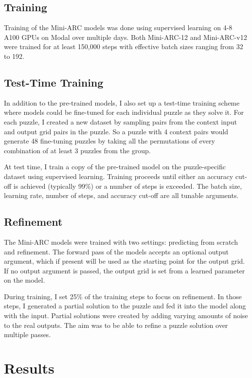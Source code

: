 \documentclass[10pt,twocolumn]{article}
\begin{document}
\subsection{Training}

Training of the Mini-ARC models was done using supervised learning on
4-8 A100 GPUs on Modal\cite{modal}
over multiple days. Both Mini-ARC-12 and Mini-ARC-v12 were trained
for at least 150,000 steps with effective batch sizes ranging from 32 to 192.

\subsection{Test-Time Training}

In addition to the pre-trained models, I also set up a test-time
training scheme where models could be fine-tuned for each individual
puzzle as they solve it. For each puzzle, I created a new dataset by
sampling pairs from the context input and output grid pairs in the
puzzle. So a puzzle with 4 context pairs would generate 48
fine-tuning puzzles by taking all the permutations of every
combination of at least 3 puzzles from the group.

At test time, I train a copy of the pre-trained model on the
puzzle-specific dataset using supervised learning. Training proceeds
until either an accuracy cut-off is achieved (typically 99\%) or a
number of steps is exceeded. The batch size, learning rate, number of
steps, and accuracy cut-off are all tunable arguments.

\subsection{Refinement}

The Mini-ARC models were trained with two settings: predicting from
scratch and refinement. The forward pass of the models accepts an
optional output argument, which if present will be used as the
starting point for the output grid. If no output argument is passed,
the output grid is set from a learned parameter on the model.

During training, I set 25\% of the training steps to focus on
refinement. In those steps, I generated a partial solution to the
puzzle and fed it into the model along with the input. Partial
solutions were created by adding varying amounts of noise to the real
outputs. The aim was to be able to refine a puzzle solution over
multiple passes.

\section{Results}
\end{document}
